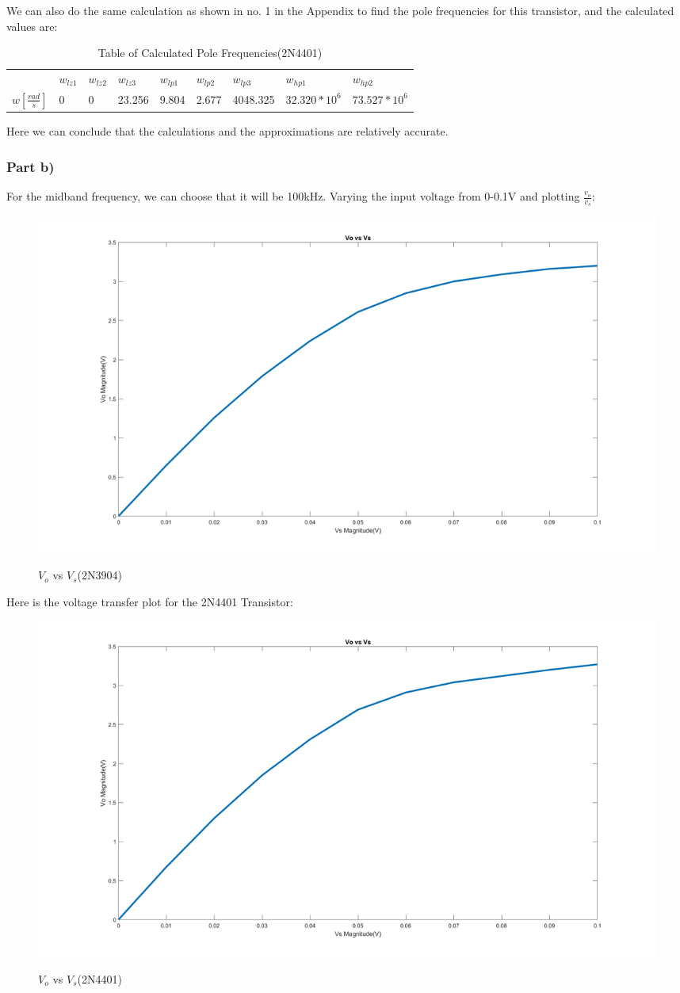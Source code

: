 \documentclass[12pt]{article}
\begin{document}
We can also do the same calculation as shown in no. 1 in the Appendix to find the pole frequencies for this transistor, and the calculated values are:

\begin{table}[h!]
\centering
\begin{tabular}{|l|l|l|l|l|l|l|l|l|}
\cline{1-2} \cline{3-9}
             & $w_{lz1}$ & $w_{lz2}$ & $w_{lz3}$ & $w_{lp1}$  & $w_{lp2}$  & $w_{lp3}$     & $w_{hp1}$          & $w_{hp2}$           \\ \cline{1-2} \cline{3-9}
$w[\frac{rad}{s}]$ &  0    & 0     & 23.256      & 9.804 & 2.677 & 4048.325 & $32.320*10^6$ & $73.527*10^6$ \\
\hline
\end{tabular}
\caption{Table of Calculated Pole Frequencies(2N4401)}
\label{table:2N3904_Calculated_Poles}
\end{table}

Here we can conclude that the calculations and the approximations are relatively accurate.
\subsubsection{Part b)}

For the midband frequency, we can choose that it will be 100kHz. Varying the input voltage from 0-0.1V and plotting $\frac{v_o}{v_s}$:

\begin{figure}[H]
\centering
\includegraphics[height=0.45\textwidth]{Images/voltage_transfer_plot.jpg}\\
\caption{$V_o$ vs $V_s$(2N3904)}
\label{fig:transfer_plot_2N3904}
\end{figure}
Here is the voltage transfer plot for the 2N4401 Transistor:
\begin{figure}[H]
\centering
\includegraphics[height=0.45\textwidth]{Images/voltage_transfer_plot_2N4401.jpg}\\
\caption{$V_o$ vs $V_s$(2N4401)}
\label{fig:transfer_plot_2N3904}
\end{figure}
\end{document}
